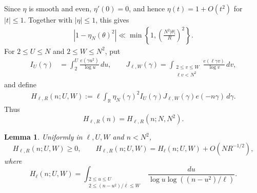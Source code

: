 \documentclass[12pt,reqno]{amsart}
\numberwithin{equation}{section}
\newtheorem{lemma}[equation]{Lemma}
\theoremstyle{definition}
\theoremstyle{remark}
\begin{document}
Since $\eta$ is smooth and even, $\eta'(0)=0$, and hence
$\eta(t)=1+O(t^2)$ for $|t|\leq1$.  Together with $|\eta|\leq1$, this
gives
\begin{align}\label{e:weyl1bound}
     |1-\eta_N(\theta)^2|
 \ll
 \min\left\{1,\left(\frac{N^2|\theta|}{R}\right)^2\right\}.
\end{align}
For \(2\leq U\leq N\) and \(2\leq W\leq N^2\), put
\begin{align}\label{e:euclideankernel}
 I_U(\gamma)
 &=
 \int_2^U\frac{e(\gamma u^2)}{\log u}\,du, \qquad 
 J_{\ell,W}(\gamma)
 =
 \int_{\substack{2\leq v\leq W\\\ell v<N^2}}
 \frac{e(\ell\gamma v)}{\log v}\,dv,
\end{align}
and define
\begin{align}\label{e:defHR92}
 H_{\ell,R}(n;U,W)
 :=
 \ell\int_{\mathbb R}
 \eta_N(\gamma)^2I_U(\gamma)J_{\ell,W}(\gamma)
 e(-n\gamma)\,d\gamma.
\end{align}
Thus
\[
 H_{\ell,R}(n)=H_{\ell,R}(n;N,N^2).
\]
\begin{lemma}\label{l:positiveH9}
Uniformly in \(\ell,U,W\) and \(n<N^2\),
\[
 H_{\ell,R}(n;U,W)\geq0,
 \qquad
 H_{\ell,R}(n;U,W)
 =
 H_\ell(n;U,W)+O(NR^{-1/2}),
\]
where
\[
 H_\ell(n;U,W)
 =
 \int_{\substack{2\leq u\leq U\\
 2\leq(n-u^2)/\ell\leq W}}
 \frac{du}{\log u\log((n-u^2)/\ell)}.
\]
\end{lemma}
\end{document}
